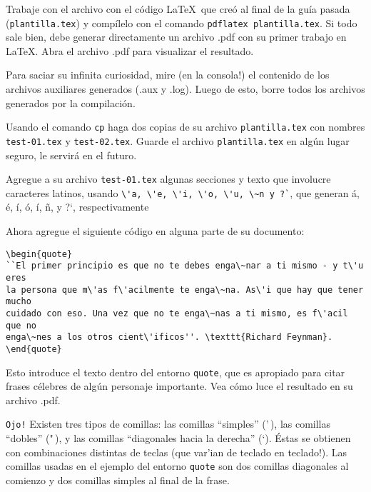 \documentclass[11pt]{exam}
\begin{document}
\begin{questions}
\item Trabaje con el archivo con el código \LaTeX\ que creó al final de la guía pasada (\texttt{plantilla.tex}) y compílelo con el comando \texttt{pdflatex plantilla.tex}. Si todo sale bien, debe generar directamente un archivo .pdf con su primer trabajo en \LaTeX.
Abra el archivo .pdf para visualizar el resultado.

\item Para saciar su infinita curiosidad, mire (en la consola!) el contenido de los archivos auxiliares generados (.aux y .log). Luego de esto, borre todos los archivos generados por la compilación.

\item Usando el comando \texttt{cp} haga dos copias de su archivo \texttt{plantilla.tex} con nombres \texttt{test-01.tex} y \texttt{test-02.tex}. Guarde el archivo \texttt{plantilla.tex} en algún lugar seguro, le servirá en el futuro.

\item Agregue a su archivo \texttt{test-01.tex} algunas secciones y texto que involucre caracteres latinos, usando \verb|\'a, \'e, \'i, \'o, \'u, \~n y ?`|, que generan á, é, í, ó, í, \~n, y ?`, respectivamente

\item Ahora agregue el siguiente código en alguna parte de su documento:

\begin{verbatim}
\begin{quote}
``El primer principio es que no te debes enga\~nar a ti mismo - y t\'u eres 
la persona que m\'as f\'acilmente te enga\~na. As\'i que hay que tener mucho 
cuidado con eso. Una vez que no te enga\~nas a ti mismo, es f\'acil que no 
enga\~nes a los otros cient\'ificos''. \texttt{Richard Feynman}.
\end{quote}
\end{verbatim}

Esto introduce el texto dentro del entorno \texttt{quote}, que es apropiado para citar frases célebres de algún personaje importante. Vea cómo luce el resultado en su archivo .pdf.

\texttt{Ojo!} Existen tres tipos de comillas: 	las comillas ``simples'' ('\,), las comillas ``dobles'' ("\,), y las comillas ``diagonales hacia la derecha'' (`). Éstas se obtienen con combinaciones distintas de teclas (que var'ian de teclado en teclado!). Las comillas usadas en el ejemplo del entorno \texttt{quote} son dos comillas diagonales al comienzo y dos comillas simples al final de la frase.



\end{questions}
\end{document}
